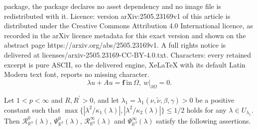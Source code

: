 \documentclass[10pt,a4paper]{amsart}
\begin{document}
package, the package declares no asset dependency and no image file is redistributed with it. Licence: version arXiv:2505.23169v1 of this article is distributed under the Creative Commons Attribution 4.0 International licence, as recorded in the arXiv licence metadata for this exact version and shown on the abstract page https://arxiv.org/abs/2505.23169v1. A full rights notice is delivered at licenses/arxiv-2505.23169-CC-BY-4.0.txt. Characters: every retained excerpt is pure ASCII, so the delivered engine, XeLaTeX with its default Latin Modern text font, reports no missing character.
\begin{equation}
\label{R-Ex-1}
\lambda u+Au=\mathbf{f}~\text{in}~\Omega, ~
w|_{\partial \Omega}=0.
\end{equation}

\begin{prop}\label{R-R3-prop2}
Let  $1<p<\infty$ and $R, R^\prime>0$, and let $\lambda_1=\lambda_1(\nu,\tilde{\nu},\beta,\gamma)>0$ be a positive constant such that $\max\{|\lambda^2/\kappa_1(\lambda)|, |\lambda^2/\kappa_2(\lambda)|\}\le 1/2$ holds for any $\lambda\in U_{\lambda_1}$. Then $\mathcal{R}_{\mathbb{R}^3}^0(\lambda)$, $\Psi_{\mathbb{R}^3}^0(\lambda)$, $\mathcal{R}_{\mathbb{R}^3}^\infty(\lambda)$ and $\Psi_{\mathbb{R}^3}^\infty(\lambda)$ satisfy the following assertions.


\vskip2mm


\end{prop}
\end{document}
